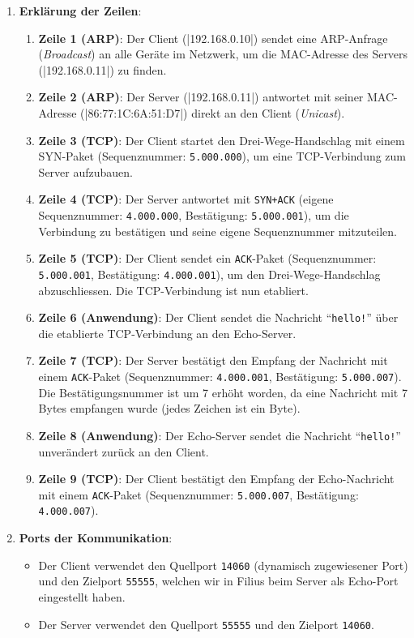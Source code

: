 \begin{myexercise}
\begin{myanswer}
		\begin{enumerate}
			\item \textbf{Erklärung der Zeilen}:
			\begin{enumerate}
			\item \textbf{Zeile 1 (ARP)}: Der Client (\commandbox|192.168.0.10|) sendet eine \gls{ARP}-Anfrage (\textit{Broadcast}) an alle Geräte im Netzwerk, um die \gls{MAC}-Adresse des Servers (\commandbox|192.168.0.11|) zu finden.
			\item \textbf{Zeile 2 (ARP)}: Der Server (\commandbox|192.168.0.11|) antwortet mit seiner \gls{MAC}-Adresse (\commandbox|86:77:1C:6A:51:D7|) direkt an den Client (\textit{Unicast}).
			\item \textbf{Zeile 3 (TCP)}: Der Client startet den Drei-Wege-Handschlag mit einem SYN-Paket (Sequenznummer: \texttt{5.000.000}), um eine \gls{TCP}-Verbindung zum Server aufzubauen.
			\item \textbf{Zeile 4 (TCP)}: Der Server antwortet mit \texttt{SYN+ACK} (eigene Sequenznummer: \texttt{4.000.000}, Bestätigung: \texttt{5.000.001}), um die Verbindung zu bestätigen und seine eigene Sequenznummer mitzuteilen.
			\item \textbf{Zeile 5 (TCP)}: Der Client sendet ein \texttt{ACK}-Paket (Sequenznummer: \texttt{5.000.001}, Bestätigung: \texttt{4.000.001}), um den Drei-Wege-Handschlag abzuschliessen. Die \gls{TCP}-Verbindung ist nun etabliert.
			\item \textbf{Zeile 6 (Anwendung)}: Der Client sendet die Nachricht \enquote{\texttt{hello!}} über die etablierte \gls{TCP}-Verbindung an den Echo-Server.
			\item \textbf{Zeile 7 (TCP)}: Der Server bestätigt den Empfang der Nachricht mit einem \texttt{ACK}-Paket (Sequenznummer: \texttt{4.000.001}, Bestätigung: \texttt{5.000.007}). Die Bestätigungsnummer ist um 7 erhöht worden, da eine Nachricht mit 7 Bytes empfangen wurde (jedes Zeichen ist ein Byte).
			\item \textbf{Zeile 8 (Anwendung)}: Der Echo-Server sendet die Nachricht \enquote{\texttt{hello!}} unverändert zurück an den Client.
			\item \textbf{Zeile 9 (TCP)}: Der Client bestätigt den Empfang der Echo-Nachricht mit einem \texttt{ACK}-Paket (Sequenznummer: \texttt{5.000.007}, Bestätigung: \texttt{4.000.007}).
		\end{enumerate}
			\item \textbf{Ports der Kommunikation}:
			\begin{itemize}
				\item Der Client verwendet den Quellport \texttt{14060} (dynamisch zugewiesener Port) und den Zielport \texttt{55555}, welchen wir in Filius beim Server als Echo-Port eingestellt haben.
				\item Der Server verwendet den Quellport \texttt{55555} und den Zielport \texttt{14060}.
			\end{itemize}
		\end{enumerate}
	\end{myanswer}
\end{myexercise}

